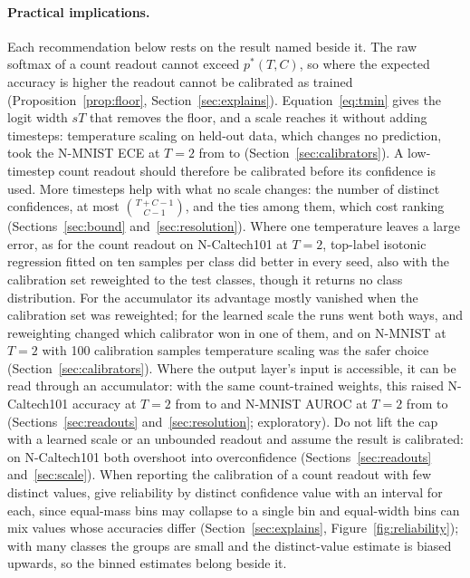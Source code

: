 \documentclass[10pt]{article}
\begin{document}
\paragraph{Practical implications.} Each recommendation below rests on the result named beside it.
The raw softmax of a count readout cannot exceed $p^{*}(T,C)$, so where the expected accuracy is
higher the readout cannot be calibrated as trained (Proposition~\ref{prop:floor},
Section~\ref{sec:explains}). Equation~\eqref{eq:tmin} gives the logit width $sT$ that removes the
floor, and a scale reaches it without adding timesteps: temperature scaling on held-out data,
which changes no prediction, took the N-MNIST ECE at $T=2$ from \hdNmTwoUncW{} to \hdNmTwoTempW{} %
(Section~\ref{sec:calibrators}). A low-timestep count readout should therefore be calibrated before
its confidence is used. More timesteps help with what no scale changes: the number of distinct
confidences, at most $\binom{T+C-1}{C-1}$, and the ties among them, which cost ranking
(Sections~\ref{sec:bound} and~\ref{sec:resolution}). Where one temperature leaves a large error,
as for the count readout on N-Caltech101 at $T=2$, top-label isotonic regression fitted on ten
samples per class did better in every seed, also with the calibration set reweighted to the test
classes, though it returns no class distribution. For the accumulator its advantage mostly
vanished when the calibration set was reweighted; for the learned scale the runs went both
ways, and reweighting changed which calibrator won in one of them, and on N-MNIST at $T=2$ with 100
calibration samples temperature scaling was the safer choice (Section~\ref{sec:calibrators}).
Where the output layer's input is accessible, it can be read through an accumulator: with the
same count-trained weights, this raised N-Caltech101 accuracy at $T=2$ from \swNcTwoCountAcc{} to \swNcTwoAccumAcc{} %
and N-MNIST AUROC at $T=2$ from \hdAurocCount{} to \swrAurocAccum{} (Sections~\ref{sec:readouts} %
and~\ref{sec:resolution}; exploratory). Do not lift the cap with a learned scale or an unbounded
readout and assume the result is calibrated: on N-Caltech101 both overshoot into overconfidence
(Sections~\ref{sec:readouts} and~\ref{sec:scale}). When reporting the calibration of a count
readout with few distinct values, give reliability by distinct confidence value with an interval
for each, since equal-mass bins may collapse to a single bin and equal-width bins can mix values
whose accuracies differ (Section~\ref{sec:explains}, Figure~\ref{fig:reliability}); with many
classes the groups are small and the distinct-value estimate is biased upwards, so the binned estimates belong
beside it.
\end{document}
